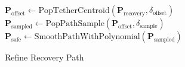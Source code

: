
\begin{algorithm}[H]
\LinesNotNumbered  %
\BlankLine
$\mathbf{P}_{\text{offset}} \gets \text{PopTetherCentroid}(\mathbf{P}_{\text{recovery}}, \delta_{\text{offset}})$\;
\\
$\mathbf{P}_{\text{sampled}} \gets \text{PopPathSample}(\mathbf{P}_{\text{offset}}, \delta_{\text{sample}})$\;
\\
$\mathbf{P}_{\text{safe}} \gets \text{SmoothPathWithPolynomial}(\mathbf{P}_{\text{sampled}})$\;
\\
\;
\caption{Refine Recovery Path}
\label{alg:refine_path}
\end{algorithm}


